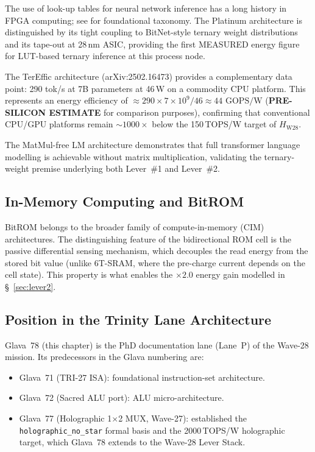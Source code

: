 The use of look-up tables for neural network inference has a long history in
FPGA computing; see \cite{trimberger1994fpga} for foundational taxonomy.
The Platinum architecture \cite{platinum_lut_pe_2026} is distinguished by its
tight coupling to BitNet-style ternary weight distributions and its tape-out
at 28\,nm ASIC, providing the first MEASURED energy figure for LUT-based
ternary inference at this process node.

The TerEffic architecture (arXiv:2502.16473) \cite{terefic_2025} provides
a complementary data point: 290 tok/s at 7B parameters at 46\,W on a
commodity CPU platform.  This represents an energy efficiency of
\(\approx 290 \times 7 \times 10^{9} / 46 \approx 44\text{ GOPS/W}\)
(\textbf{PRE-SILICON ESTIMATE} for comparison purposes), confirming that
conventional CPU/GPU platforms remain \(\sim 1000\times\) below the 150\,TOPS/W
target of \(H_{\mathrm{W28}}\).

The MatMul-free LM architecture \cite{matmul_free_2024} demonstrates that
full transformer language modelling is achievable without matrix multiplication,
validating the ternary-weight premise underlying both Lever~\#1 and Lever~\#2.

\subsection{In-Memory Computing and BitROM}

BitROM \cite{bitrom_2025} belongs to the broader family of
compute-in-memory (CIM) architectures.  The distinguishing feature of the
bidirectional ROM cell is the passive differential sensing mechanism, which
decouples the read energy from the stored bit value (unlike 6T-SRAM, where
the pre-charge current depends on the cell state).  This property is what
enables the \(\times 2.0\) energy gain modelled in §~\ref{sec:lever2}.

\subsection{Position in the Trinity Lane Architecture}

Glava~78 (this chapter) is the PhD documentation lane (Lane~P) of the
Wave-28 mission.  Its predecessors in the Glava numbering are:
\begin{itemize}
  \item Glava~71 (TRI-27 ISA): foundational instruction-set architecture.
  \item Glava~72 (Sacred ALU port): ALU micro-architecture.
  \item Glava~77 (Holographic 1\(\times\)2 MUX, Wave-27): established the
    \texttt{holographic\_no\_star} formal basis and the 2000\,TOPS/W
    holographic target, which Glava~78 extends to the Wave-28 Lever Stack.
\end{itemize}

